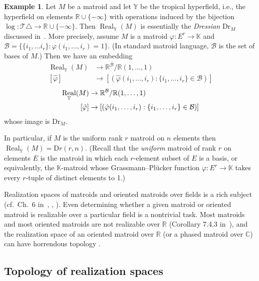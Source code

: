 \documentclass[10pt, preprint]{article}
\def\R{\mathbb R}
\def\Y{\mathbb Y}
\theoremstyle{definition}
\newtheorem{example}[theorem]{Example}
\DeclareMathOperator{\real}{Real}
\begin{document}
\begin{example}
Let $M$ be a matroid and let $\mathbb{Y}$ be the tropical hyperfield,
i.e., the hyperfield on elements $\mathbb{R}\cup \{-\infty \}$ with
operations induced by the bijection $\log :\mathcal{T }\triangle
\to \mathbb{R}\cup \{-\infty \}$. Then $\operatorname{Real}_{
\mathbb{Y}}(M)$ is essentially the \emph{Dressian} $\mathrm{Dr}_{M}$
discussed in~\cite{Maclagan-Sturmfels}. More precisely, assume
$M$ is a matroid $\varphi : E^{r}\to \mathbb{K}$ and ${\mathcal B}=\{\{i
_{1}, \ldots i_{r}\}:\varphi (i_{1}, \ldots , i_{r})=1\}$. (In standard
matroid language, $\mathcal B$ is the set of bases of $M$.) Then we have an
embedding
%
\begin{align}
\operatorname{Real}_{\mathbb{Y}}(M)
&\to \mathbb{R}^{\mathcal B}/
\mathbb{R}(1,\ldots , 1)\\
[\hat{\varphi }]&\to [(
\hat{\varphi }(i_{1}, \ldots , i_{r}): \{i_{1}, \ldots , i_{r}\}
\in \mathcal B)]
\end{align}
%
\begin{align}
	\real_{\Y}(M)&\to \R^{\cal B}/\R(1,\ldots, 1)\\
	[\hat\varphi]&\to [(\hat\varphi(i_1, \ldots, i_r): \{i_1, \ldots, i_r\}\in\cal B)]
	\end{align}
whose image is $\mathrm{Dr}_{M}$.

In particular, if $M$ is the uniform rank $r$ matroid on $n$ elements
then $\operatorname{Real}_{\mathbb{Y}}(M)={\mathrm{D}r}(r,n)$. (Recall
that the \emph{uniform} matroid of rank $r$ on elements $E$ is the
matroid in which each $r$-element subset of $E$ is a basis, or
equivalently, the $\mathbb{K}$-matroid whose Grassmann--Pl\"{u}cker
function $\varphi : E^{r}\to \mathbb{K}$ takes every $r$-tuple of
distinct elements to 1.)
\end{example}

Realization spaces of matroids and oriented matroids over fields is a
rich subject (cf.~Ch.~6 in~\cite{Oxley},
\cite{ZieglerOMtoday}, \cite{Ruiz}). Even determining whether a
given matroid or oriented matroid is realizable over a particular field
is a nontrivial task. Most matroids and most oriented matroids are not
realizable over $\mathbb{R}$ (Corollary 7.4.3 in~\cite{BLSWZ}),
and the realization space of an oriented matroid over $\mathbb{R}$ (or
a phased matroid over $\mathbb{C}$) can have horrendous topology
\cite{Mnev}.

\subsection{Topology of realization spaces}
\end{document}
